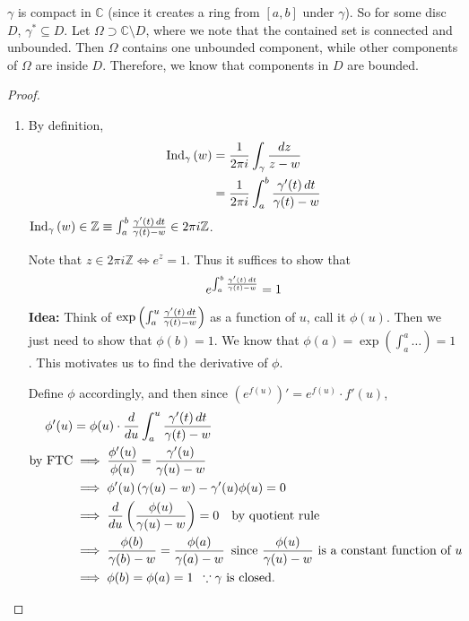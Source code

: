 \documentclass[11pt, oneside]{book}
\begin{document}
\begin{note}
	$\gamma$ is compact in $\mathbb{C}$ (since it creates a ring from $[a, b]$ under $\gamma$). So for some disc $D$, $\gamma^* \subseteq D$. Let $\Omega \supset \mathbb{C} \setminus D$, where we note that the contained set is connected and unbounded. Then $\Omega$ contains one unbounded component, while other components of $\Omega$ are inside $D$. Therefore, we know that components in $D$ are bounded.
\end{note}

\begin{proof}
	\begin{enumerate}
		\item By definition,
		\begin{align*}
			\operatorname{Ind}_{\gamma}\left( w \right)
				&= \frac{1}{2 \pi i } \int_{\gamma} \frac{\mathop{}\!d{z}}{z - w} \\
				&= \frac{1}{2 \pi i} \int_{a}^{b} \frac{\gamma'(t) \mathop{}\!d{t}}{\gamma(t) - w} 
		\end{align*}
		 $\operatorname{Ind}_{\gamma}\left( w \right) \in \mathbb{Z} \equiv \int_{a}^{b} \frac{\gamma'(t) \mathop{}\!d{t}}{\gamma(t) - w} \in 2 \pi i \mathbb{Z}$.

		Note that $z \in 2 \pi i \mathbb{Z} \iff e^z = 1$. Thus it suffices to show that
		\begin{equation*}
			e^{\int_{a}^{b} \frac{\gamma'(t) \mathop{}\!d{t}}{\gamma(t) - w}} = 1
		\end{equation*}

		\textbf{Idea: } Think of $\exp\left(\int_{a}^{u} \frac{\gamma'(t) \mathop{}\!d{t}}{\gamma(t) - w}\right)$ as a function of $u$, call it $\phi(u)$. Then we just need to show that $\phi(b) = 1$. We know that $\phi(a) = \exp\left(\int_{a}^{a} \hdots \right) = 1$. This motivates us to find the derivative of $\phi$.

		Define $\phi$ accordingly, and then since $(e^{f(u)})' = e^{f(u)} \cdot f'(u)$,
		\begin{align*}
			\phi'(u) &= \phi(u) \cdot \frac{d}{du} \int_{a}^{u} \frac{\gamma'(t) \mathop{}\!d{t}}{\gamma(t) - w} \\
			\text{by FTC} &\implies \frac{\phi'(u)}{\phi(u)} = \frac{\gamma'(u)}{\gamma(u) - w} \\
			&\implies \phi'(u) \left( \gamma(u) - w \right) - \gamma'(u) \phi(u) = 0 \\
			&\implies \frac{d}{du} \left( \frac{\phi(u)}{\gamma(u) - w} \right) = 0 \quad \text{by quotient rule} \\
			&\implies \frac{\phi(b)}{\gamma(b) - w} = \frac{\phi(a)}{\gamma(a) - w} \enspace \text{since } \frac{\phi(u)}{\gamma(u) - w} \text{ is a constant function of } u \\
			&\implies \phi(b) = \phi(a) = 1 \enspace \because \gamma \text{ is closed.}
		\end{align*}


\end{enumerate}
\end{proof}
\end{document}
